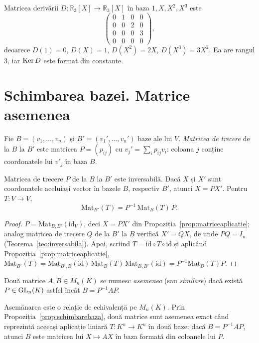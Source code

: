\begin{exemplu}
Matricea derivării $D:\mathbb{R}_3[X]\to\mathbb{R}_3[X]$ în baza $1,X,X^2,X^3$ este
\[
\begin{pmatrix}0&1&0&0\\0&0&2&0\\0&0&0&3\\0&0&0&0\end{pmatrix},
\]
deoarece $D(1)=0$, $D(X)=1$, $D(X^2)=2X$, $D(X^3)=3X^2$. Ea are rangul $3$, iar $\operatorname{Ker} D$ este format din constante.
\end{exemplu}

\section{Schimbarea bazei. Matrice asemenea}

\begin{definitie}
Fie $B=(v_1,\dots,v_n)$ și $B'=(v_1',\dots,v_n')$ baze ale lui $V$. \emph{Matricea de trecere} de la $B$ la $B'$ este matricea $P=(p_{ij})$ cu $v_j'=\sum_ip_{ij}v_i$: coloana $j$ conține coordonatele lui $v'_j$ în baza $B$.
\end{definitie}

\begin{propozitie}\label{prop:schimbarebaza}
Matricea de trecere $P$ de la $B$ la $B'$ este inversabilă. Dacă $X$ și $X'$ sunt coordonatele aceluiași vector în bazele $B$, respectiv $B'$, atunci $X=PX'$. Pentru $T:V\to V$,
\[
\mathrm{Mat}_{B'}(T)=P^{-1}\,\mathrm{Mat}_B(T)\,P .
\]
\end{propozitie}

\begin{proof}
$P=\mathrm{Mat}_{B,B'}(\mathrm{id}_V)$, deci $X=PX'$ din Propoziția~\ref{prop:matriceaplicatie}; analog matricea de trecere $Q$ de la $B'$ la $B$ verifică $X'=QX$, de unde $PQ=I_n$ (Teorema~\ref{teo:inversabila}). Apoi, scriind $T=\mathrm{id}\circ T\circ\mathrm{id}$ și aplicând Propoziția~\ref{prop:matriceaplicatie},
$\mathrm{Mat}_{B'}(T)=\mathrm{Mat}_{B',B}(\mathrm{id})\,\mathrm{Mat}_B(T)\,\mathrm{Mat}_{B,B'}(\mathrm{id})=P^{-1}\mathrm{Mat}_B(T)P$.
\end{proof}

\begin{definitie}\label{def:asemenea}
Două matrice $A,B\in M_n(K)$ se numesc \emph{asemenea} (sau \emph{similare}) dacă există $P\in\mathrm{GL}_n(K)$ astfel încât $B=P^{-1}AP$.
\end{definitie}

Asemănarea este o relație de echivalență pe $M_n(K)$. Prin Propoziția~\ref{prop:schimbarebaza}, două matrice sunt asemenea exact când reprezintă aceeași aplicație liniară $T:K^n\to K^n$ în două baze: dacă $B=P^{-1}AP$, atunci $B$ este matricea lui $X\mapsto AX$ în baza formată din coloanele lui $P$.

